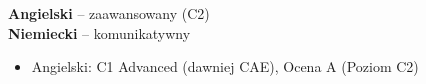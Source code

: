 \documentclass[9pt]{developercv} %
\begin{document}

\begin{minipage}[t]{0.3\textwidth}
	\vspace{-\baselineskip} %

	
    \textbf{Angielski} -- zaawansowany (C2)\\
	\textbf{Niemiecki} -- komunikatywny
\end{minipage}
\hfill
\begin{minipage}[t]{0.3\textwidth}
	\vspace{-\baselineskip} %
	
	
	\lorem
\end{minipage}
\hfill
\begin{minipage}[t]{0.35\textwidth}
	\vspace{-\baselineskip} %
	\begin{itemize}
        \vspace{-\baselineskip} %
	    \item Angielski: C1 Advanced (dawniej CAE), Ocena A (Poziom C2)
	\end{itemize}
\end{minipage}

\end{document}
